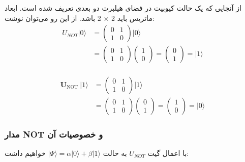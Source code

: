 \documentclass{book}
\begin{document}
از آنجایی که یک حالت کیوبیت در فضای هیلبرت دو بعدی تعریف شده است. ابعاد ماتریس باید 2 × 2 باشد. از این رو می‌توان نوشت:
$$
\begin{aligned}
	U_{N O T}|0\rangle & =\left(\begin{array}{ll}
		0 & 1 \\
		1 & 0
	\end{array}\right)|0\rangle \\
	& =\left(\begin{array}{ll}
		0 & 1 \\
		1 & 0
	\end{array}\right)\left(\begin{array}{l}
		1 \\
		0
	\end{array}\right)=\left(\begin{array}{l}
		0 \\
		1
	\end{array}\right)=|1\rangle
\end{aligned}
$$\\

$$
\begin{aligned}
	\boldsymbol{U}_{\text {NOT }}|1\rangle & =\left(\begin{array}{ll}
		0 & 1 \\
		1 & 0
	\end{array}\right)|1\rangle \\
	& =\left(\begin{array}{ll}
		0 & 1 \\
		1 & 0
	\end{array}\right)\left(\begin{array}{l}
		0 \\
		1
	\end{array}\right)=\left(\begin{array}{l}
		1 \\
		0
	\end{array}\right)=|0\rangle
\end{aligned}
$$

\subsubsection{مدار NOT و خصوصیات آن}
با اعمال گیت $U_{NOT}$ به حالت $\vert \Psi \rangle = \alpha \vert 0 \rangle + \beta \vert 1\rangle$ خواهیم داشت:
 
\end{document}
